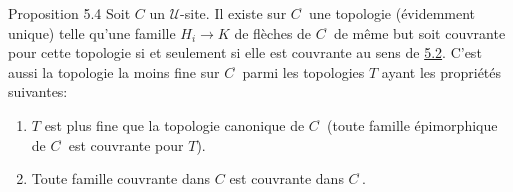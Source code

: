 \documentclass[10pt]{../fichiers-configuration-latex/smfart}
\begin{document}
\begin{enonce*}{Proposition 5.4}
Soit $C$ un $𝒰$-site. Il existe sur
$C^{\widehat{\phantom{,}}}$ une topologie (évidemment unique)
telle qu'une famille $H_i\rightarrow K$ de flèches de
$C^{\widehat{\phantom{,}}}$ de même but soit couvrante pour cette
topologie si et seulement si elle est couvrante au sens de
\hyperref[II.def5.2]{5.2}. C'est aussi la topologie la moins fine sur
$C^{\widehat{\phantom{,}}}$ parmi les topologies $T$ ayant les
propriétés suivantes:
\begin{enumerate}
\renewcommand{\theenumi}{\alph{enumi}}
\renewcommand{\labelenumi}{\theenumi)}
\item $T$ est plus fine que la topologie canonique de
  $C^{\widehat{\phantom{,}}}$ (\ie toute famille épimorphique de
  $C^{\widehat{\phantom{,}}}$ est couvrante pour $T$).

\item Toute famille couvrante dans $C$ est couvrante dans
  $C^{\widehat{\phantom{,}}}$.
\end{enumerate}
\end{enonce*}
\end{document}
